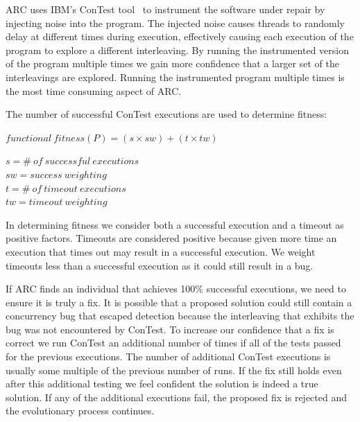ARC uses IBM's ConTest tool~\cite{EFN+02} to instrument the software under repair by injecting noise into the
program. The injected noise causes threads to randomly delay at different times during execution,
effectively causing each execution of the program to explore a different interleaving. By running the instrumented version of the program multiple times we gain more confidence that a larger set of the interleavings
are explored. Running the instrumented program multiple times is the most time
consuming aspect of ARC.

The number of successful ConTest executions are used to determine fitness:

\begin{footnotesize}
\begin{center}
$functional\ fitness(P) = (s \times sw) + (t \times tw)$
\end{center}
\end{footnotesize}
\begin{scriptsize}
\begin{center}
$s = \#\ of\ successful\ executions$ \\
$sw = success\ weighting$ \\
$t = \#\ of\ timeout\ executions$ \\
$tw = timeout\ weighting$
\end{center}
\end{scriptsize}

\noindent In determining fitness we consider both a successful execution and a timeout as positive factors. Timeouts are considered positive because given more time an execution that times out may result in a successful execution. We weight timeouts less than a successful execution as it could still result in a bug.

If ARC finds an individual that achieves 100\% successful executions, we need
to ensure it is truly a fix. It is possible that a proposed solution could
still contain a concurrency bug that escaped detection because the interleaving that exhibits the bug was not encountered by ConTest. To increase our confidence that a fix is correct we run ConTest
an additional number of times if all of the tests passed for the previous executions. The number of additional ConTest executions is usually some multiple of the previous number of runs. If the fix still holds even after this additional testing we feel confident the solution is indeed a true solution. If any of the additional executions fail,
the proposed fix is rejected and the evolutionary process continues.

